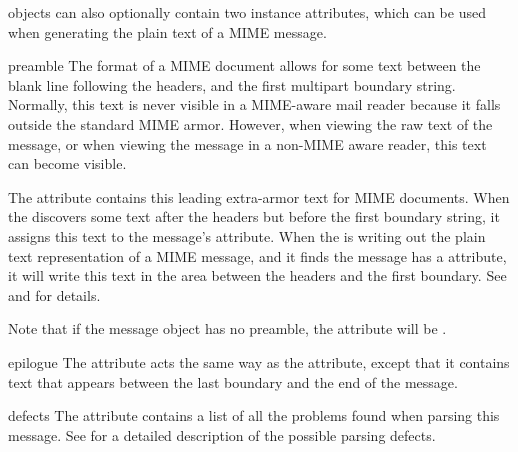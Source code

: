 
 objects can also optionally contain two instance
attributes, which can be used when generating the plain text of a MIME
message.

\begin{datadesc}{preamble}
The format of a MIME document allows for some text between the blank
line following the headers, and the first multipart boundary string.
Normally, this text is never visible in a MIME-aware mail reader
because it falls outside the standard MIME armor.  However, when
viewing the raw text of the message, or when viewing the message in a
non-MIME aware reader, this text can become visible.

The  attribute contains this leading extra-armor text
for MIME documents.  When the  discovers some text after
the headers but before the first boundary string, it assigns this text
to the message's  attribute.  When the 
is writing out the plain text representation of a MIME message, and it
finds the message has a  attribute, it will write this
text in the area between the headers and the first boundary.  See
 and  for details.

Note that if the message object has no preamble, the
 attribute will be .
\end{datadesc}

\begin{datadesc}{epilogue}
The  attribute acts the same way as the 
attribute, except that it contains text that appears between the last
boundary and the end of the message.

\end{datadesc}

\begin{datadesc}{defects}
The  attribute contains a list of all the problems found when
parsing this message.  See  for a detailed description
of the possible parsing defects.

\end{datadesc}
